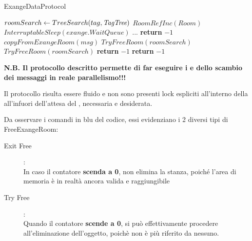 \newpage

\begin{algorithm}
\caption{\Reader ExangeDataProtocol}\label{readExange}
\begin{algorithmic}[1]
\State $roomSearch \gets TreeSearch(tag, \textit{TagTree})$
    \State $RoomRefInc(Room)$
        \State $InterruptableSleep(exange.WaitQueue)$
        \State ...
                \State \textbf{return} $-1$
            \EndIf
        \State $copyFromExangeRoom(msg)$ 
        \State $TryFreeRoom(roomSearch)$
    \Else
        \State $TryFreeRoom(roomSearch)$
        \State \textbf{return} $-1$
    \EndIf
\Else
    \State \textbf{return} $-1$
\EndIf
\EndProcedure
\end{algorithmic}
\end{algorithm}

\textbf{N.B. Il protocollo descritto permette di far eseguire i \Writer e \Reader dello scambio dei messaggi in reale
parallelismo!!!}

Il protocollo risulta essere fluido e non sono presenti lock espliciti all'interno della \exangeRoom all'infuori
dell'attesa del \Reader, necessaria e desiderata.

Da osservare i comandi in {\color{blue} blu} del codice, essi evidenziano i 2 diversi tipi di FreeExangeRoom:
\begin{description}
\item[Exit Free]:\\
In caso il contatore \textbf{scenda a 0}, non elimina la stanza, poiché l'area di memoria è in realtà ancora valida e
raggiungibile
\item[Try Free]:\\
Quando il contatore \textbf{scende a 0}, si può effettivamente procedere all'eliminazione dell'oggetto, poichè non è più
riferito da nessuno.
\end{description}

